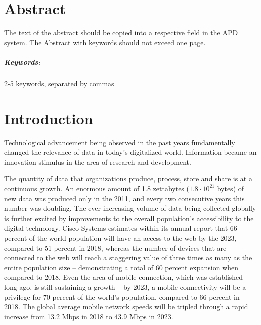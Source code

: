 \documentclass[a4paper,twoside,12pt]{book}
\newcounter{PagesWithoutNumbers}
\begin{document}
\cleardoublepage
 

\rmfamily
\normalfont



\pagestyle{onlyPageNumbers}
\tableofcontents

\setcounter{PagesWithoutNumbers}{\value{page}}
\mainmatter
\pagestyle{empty}

\chapter*{Abstract}

The text of the abstract should be copied into a respective field in the APD system. The Abstract with keywords should not exceed one page.

\paragraph{Keywords:} 2-5 keywords, separated by commas



\cleardoublepage


\pagestyle{PageNumbersChapterTitles}



\chapter{Introduction}

Technological advancement being observed in the past years fundamentally changed the relevance of data in today's digitalized world. Information became an innovation stimulus in the area of research and development.


The quantity of data that organizations produce, process, store and share is at a continuous growth. An enormous amount of 1.8 zettabytes ($1.8 \cdot 10^{21}$ bytes) of new data was produced only in the 2011, and every two consecutive years this number was doubling.\cite{bib:big_data_security} The ever increasing volume of data being collected globally is further excited by improvements to the overall population's accessibility to the digital technology. Cisco Systems estimates within its annual report that 66 percent of the world population will have an access to the web by the 2023, compared to 51 percent in 2018, whereas the number of devices that are connected to the web will reach a staggering value of three times as many as the entire population size – demonstrating a total of 60 percent expansion when compared to 2018. Even the area of mobile connection, which was established long ago, is still sustaining a growth – by 2023, a mobile connectivity will be a privilege for 70 percent of the world's population, compared to 66 percent in 2018. The global average mobile network speeds will be tripled through a rapid increase from 13.2 Mbps in 2018 to 43.9 Mbps in 2023.\cite{bib:cisco_annual}
\end{document}
